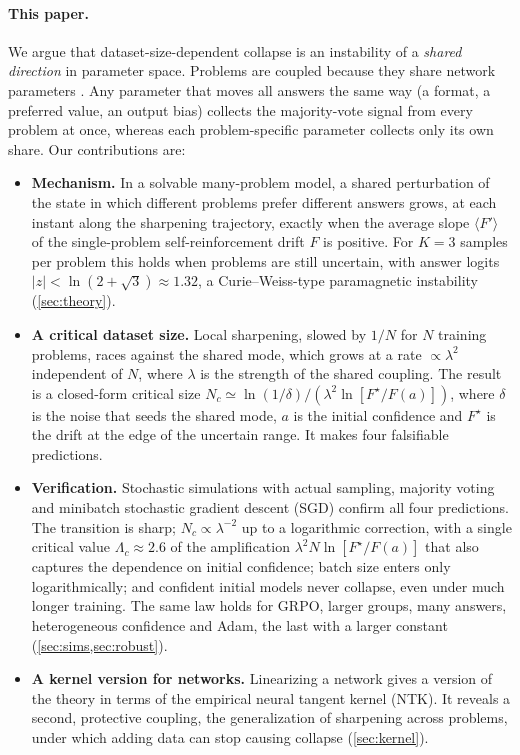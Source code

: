 \paragraph{This paper.}
We argue that dataset-size-dependent collapse is an instability of a \emph{shared direction} in parameter space.
Problems are coupled because they share network parameters \citep{jacot2018ntk,ren2025learning,fan2026sharpening}.
Any parameter that moves all answers the same way (a format, a preferred value, an output bias) collects the majority-vote signal from every problem at once, whereas each problem-specific parameter collects only its own share.
Our contributions are:
\begin{itemize}\setlength\itemsep{1pt}
\item \textbf{Mechanism.} In a solvable many-problem model, a shared perturbation of the state in which different problems prefer different answers grows, at each instant along the sharpening trajectory, exactly when the average slope $\langle F'\rangle$ of the single-problem self-reinforcement drift $F$ is positive. For $K=3$ samples per problem this holds when problems are still uncertain, with answer logits $|z|<\ln(2+\sqrt3)\approx1.32$, a Curie--Weiss-type paramagnetic instability (\cref{sec:theory}).
\item \textbf{A critical dataset size.} Local sharpening, slowed by $1/N$ for $N$ training problems, races against the shared mode, which grows at a rate $\propto\lambda^2$ independent of $N$, where $\lambda$ is the strength of the shared coupling. The result is a closed-form critical size $N_c\simeq\ln(1/\delta)/(\lambda^2\ln[F^\star/F(a)])$, where $\delta$ is the noise that seeds the shared mode, $a$ is the initial confidence and $F^\star$ is the drift at the edge of the uncertain range. It makes four falsifiable predictions.
\item \textbf{Verification.} Stochastic simulations with actual sampling, majority voting and minibatch stochastic gradient descent (SGD) confirm all four predictions. The transition is sharp; $N_c\propto\lambda^{-2}$ up to a logarithmic correction, with a single critical value $\Lambda_c\approx2.6$ of the amplification $\lambda^2N\ln[F^\star/F(a)]$ that also captures the dependence on initial confidence; batch size enters only logarithmically; and confident initial models never collapse, even under much longer training. The same law holds for GRPO, larger groups, many answers, heterogeneous confidence and Adam, the last with a larger constant (\cref{sec:sims,sec:robust}).
\item \textbf{A kernel version for networks.} Linearizing a network gives a version of the theory in terms of the empirical neural tangent kernel (NTK). It reveals a second, protective coupling, the generalization of sharpening across problems, under which adding data can stop causing collapse (\cref{sec:kernel}).

\end{itemize}
